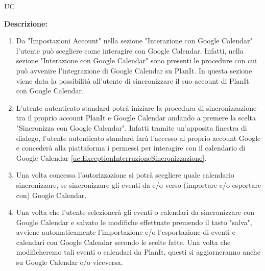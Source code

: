 \begin{listaPersonale}{UC}
\begin{listaPersonale2}[UC] {}
\begin{listaPersonale3} [UC]{}
            \textbf{Descrizione:} \\
            \begin{enumerate}
                \item Da "Impostazioni Account" nella sezione "Interazione con Google Calendar" l'utente può scegliere come interagire con Google Calendar. Infatti, nella sezione "Interazione con Google Calendar" sono presenti le procedure con cui può avvenire l'integrazione di Google Calendar su PlanIt. In questa sezione viene data la possibilità all'utente di sincronizzare il suo account di PlanIt con Google Calendar.
                \item L'utente autenticato standard potrà iniziare la procedura di sincronizzazione tra il proprio account PlanIt e Google Calendar andando a premere la scelta "Sincronizza con Google Calendar". Infatti tramite un'apposita finestra di dialogo, l'utente autenticato standard farà l'accesso al proprio account Google e concederà alla piattaforma i permessi per interagire con il calendario di Google Calendar \ref{uc:ExceptionInterruzioneSincronizzazione}.
                \item Una volta concessa l'autorizzazione si potrà scegliere quale calendario sincronizzare, se sincronizzare gli eventi da e/o verso (importare e/o esportare con) Google Calendar.
                \item Una volta che l'utente selezionerà gli eventi o calendari da sincronizzare con Google Calendar e salvato le modifiche effettuate premendo il tasto "salva", avviene automaticamente l'importazione e/o l'esportazione di eventi e calendari con Google Calendar secondo le scelte fatte. Una volta che modificheremo tali eventi o calendari da PlanIt, questi si aggiorneranno anche su Google Calendar e/o viceversa.
            \end{enumerate}



\end{listaPersonale3}
\end{listaPersonale2}
\end{listaPersonale}
